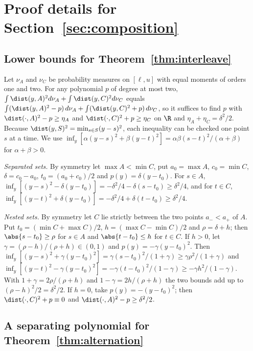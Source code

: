 \section{Proof details for Section~\ref{sec:composition}}\label{app:composition}

\subsection{Lower bounds for Theorem~\ref{thm:interleave}}\label{app:interleave}

Let $\nu_A$ and $\nu_C$ be probability measures on $[\ell,u]$ with equal moments
of orders one and two. For any polynomial $p$ of degree at most two,
$\int\dist(y,A)^2d\nu_A+\int\dist(y,C)^2d\nu_C$ equals
$\int(\dist(y,A)^2-p)\,d\nu_A+\int(\dist(y,C)^2+p)\,d\nu_C$, so it suffices to
find $p$ with $\dist(\cdot,A)^2-p\ge\eta_A$ and $\dist(\cdot,C)^2+p\ge\eta_C$ on
$\R$ and $\eta_A+\eta_C=\delta^2/2$. Because $\dist(y,S)^2=\min_{s\in S}(y-s)^2$,
each inequality can be checked one point $s$ at a time. We use
$\inf_y[\alpha(y-s)^2+\beta(y-t)^2]=\alpha\beta(s-t)^2/(\alpha+\beta)$ for
$\alpha+\beta>0$.

\emph{Separated sets.} By symmetry let $\max A<\min C$, put $a_0=\max A$,
$c_0=\min C$, $\delta=c_0-a_0$, $t_0=(a_0+c_0)/2$ and $p(y)=\delta(y-t_0)$. For
$s\in A$, $\inf_y[(y-s)^2-\delta(y-t_0)]=-\delta^2/4-\delta(s-t_0)\ge\delta^2/4$, and
for $t\in C$, $\inf_y[(y-t)^2+\delta(y-t_0)]=-\delta^2/4+\delta(t-t_0)\ge\delta^2/4$.

\emph{Nested sets.} By symmetry let $C$ lie strictly between the two points
$a_-<a_+$ of $A$. Put $t_0=(\min C+\max C)/2$, $h=(\max C-\min C)/2$ and
$\rho=\delta+h$; then $\abs{s-t_0}\ge\rho$ for $s\in A$ and $\abs{t-t_0}\le h$ for
$t\in C$. If $h>0$, let $\gamma=(\rho-h)/(\rho+h)\in(0,1)$ and
$p(y)=-\gamma(y-t_0)^2$. Then
$\inf_y[(y-s)^2+\gamma(y-t_0)^2]=\gamma(s-t_0)^2/(1+\gamma)\ge\gamma\rho^2/(1+\gamma)$ and
$\inf_y[(y-t)^2-\gamma(y-t_0)^2]=-\gamma(t-t_0)^2/(1-\gamma)\ge-\gamma h^2/(1-\gamma)$.
With $1+\gamma=2\rho/(\rho+h)$ and $1-\gamma=2h/(\rho+h)$ the two bounds add up to
$(\rho-h)^2/2=\delta^2/2$. If $h=0$, take $p(y)=-(y-t_0)^2$; then
$\dist(\cdot,C)^2+p\equiv0$ and $\dist(\cdot,A)^2-p\ge\delta^2/2$.

\subsection{A separating polynomial for Theorem~\ref{thm:alternation}}\label{app:alternation}

